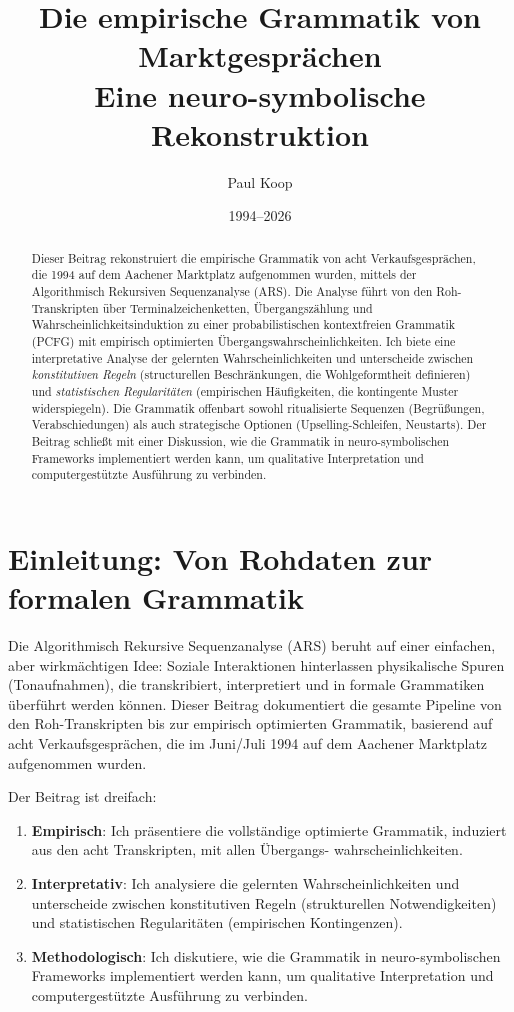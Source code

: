 \documentclass[12pt,a4paper]{article}
\title{\Huge\textbf{Die empirische Grammatik von Marktgesprächen} \\[2mm]
       \LARGE Eine neuro-symbolische Rekonstruktion}
\author{
  \large
  \begin{tabular}{c}
    Paul Koop
  \end{tabular}
}
\date{\large 1994--2026}
\begin{document}
\maketitle

\begin{abstract}
Dieser Beitrag rekonstruiert die empirische Grammatik von acht Verkaufsgesprächen,
die 1994 auf dem Aachener Marktplatz aufgenommen wurden, mittels der Algorithmisch
Rekursiven Sequenzanalyse (ARS). Die Analyse führt von den Roh-Transkripten über
Terminalzeichenketten, Übergangszählung und Wahrscheinlichkeitsinduktion zu einer
probabilistischen kontextfreien Grammatik (PCFG) mit empirisch optimierten
Übergangswahrscheinlichkeiten. Ich biete eine interpretative Analyse der gelernten
Wahrscheinlichkeiten und unterscheide zwischen \textit{konstitutiven Regeln}
(structurellen Beschränkungen, die Wohlgeformtheit definieren) und \textit{statistischen
Regularitäten} (empirischen Häufigkeiten, die kontingente Muster widerspiegeln).
Die Grammatik offenbart sowohl ritualisierte Sequenzen (Begrüßungen, Verabschiedungen)
als auch strategische Optionen (Upselling-Schleifen, Neustarts). Der Beitrag schließt
mit einer Diskussion, wie die Grammatik in neuro-symbolischen Frameworks implementiert
werden kann, um qualitative Interpretation und computergestützte Ausführung zu
verbinden.
\end{abstract}

\newpage
\tableofcontents
\newpage

\section{Einleitung: Von Rohdaten zur formalen Grammatik}

Die Algorithmisch Rekursive Sequenzanalyse (ARS) beruht auf einer einfachen,
aber wirkmächtigen Idee: Soziale Interaktionen hinterlassen physikalische Spuren
(Tonaufnahmen), die transkribiert, interpretiert und in formale Grammatiken
überführt werden können. Dieser Beitrag dokumentiert die gesamte Pipeline von
den Roh-Transkripten bis zur empirisch optimierten Grammatik, basierend auf
acht Verkaufsgesprächen, die im Juni/Juli 1994 auf dem Aachener Marktplatz
aufgenommen wurden.

Der Beitrag ist dreifach:

\begin{enumerate}
    \item \textbf{Empirisch}: Ich präsentiere die vollständige optimierte
    Grammatik, induziert aus den acht Transkripten, mit allen Übergangs-
    wahrscheinlichkeiten.
    
    \item \textbf{Interpretativ}: Ich analysiere die gelernten Wahrscheinlichkeiten
    und unterscheide zwischen konstitutiven Regeln (strukturellen Notwendigkeiten)
    und statistischen Regularitäten (empirischen Kontingenzen).
    
    \item \textbf{Methodologisch}: Ich diskutiere, wie die Grammatik in
    neuro-symbolischen Frameworks implementiert werden kann, um qualitative
    Interpretation und computergestützte Ausführung zu verbinden.
\end{enumerate}
\end{document}
